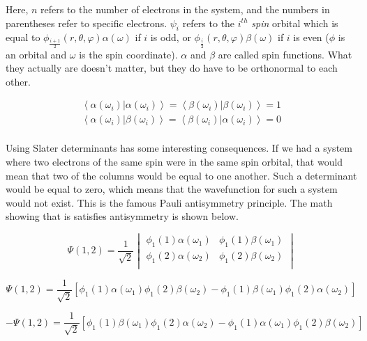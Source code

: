 Here, $n$ refers to the number of electrons in the system, and the numbers in parentheses refer to specific electrons. $\psi_{i}$ refers to the $i^{th}$ \textit{spin} orbital which is equal to $\phi_{\frac{i+1}{2}}(r, \theta, \varphi)\alpha(\omega)$ if $i$ is odd, or $\phi_{\frac{i}{2}}(r, \theta, \varphi)\beta(\omega)$ if $i$ is even ($\phi$ is an orbital and $\omega$ is the spin coordinate). $\alpha$ and $\beta$ are called spin functions. What they actually are doesn't matter, but they do have to be orthonormal to each other. 

\begin{equation}
\label{eq:a_b_def}
\begin{split}
\left<\alpha(\omega_{i})|\alpha(\omega_{i})\right> = \left<\beta(\omega_{i})|\beta(\omega_{i})\right> = 1	\\
\left<\alpha(\omega_{i})|\beta(\omega_{i})\right> = \left<\beta(\omega_{i})|\alpha(\omega_{i})\right> = 0	\\
\end{split}
\end{equation}

Using Slater determinants has some interesting consequences. If we had a system where two electrons of the same spin were in the same spin orbital, that would mean that two of the columns would be equal to one another. Such a determinant would be equal to zero, which means that the wavefunction for such a system would not exist. This is the famous Pauli antisymmetry principle\cite{Pauli1925}. The math showing that is satisfies antisymmetry is shown below\cite{Ostlund}.

\begin{equation}
\label{eq:pauli_2t_1}
\Psi(1,2) =
\frac{1}{\sqrt{2}}
\begin{vmatrix}
\phi_{1}(1)\alpha(\omega_{1})		&	\phi_{1}(1)\beta(\omega_{1})		\\
\phi_{1}(2)\alpha(\omega_{2})		&	\phi_{1}(2)\beta(\omega_{2})		\\
\end{vmatrix}
\end{equation}

\begin{equation}
\label{eq:pauli_2t_2}
\Psi(1,2) =
\frac{1}{\sqrt{2}}
\left[
\phi_{1}(1)\alpha(\omega_{1})\phi_{1}(2)\beta(\omega_{2}) -
\phi_{1}(1)\beta(\omega_{1})\phi_{1}(2)\alpha(\omega_{2})
\right]
\end{equation}

\begin{equation}
\label{eq:pauli_2t_3}
-\Psi(1,2) =
\frac{1}{\sqrt{2}}
\left[
\phi_{1}(1)\beta(\omega_{1})\phi_{1}(2)\alpha(\omega_{2}) -
\phi_{1}(1)\alpha(\omega_{1})\phi_{1}(2)\beta(\omega_{2})
\right]
\end{equation}

